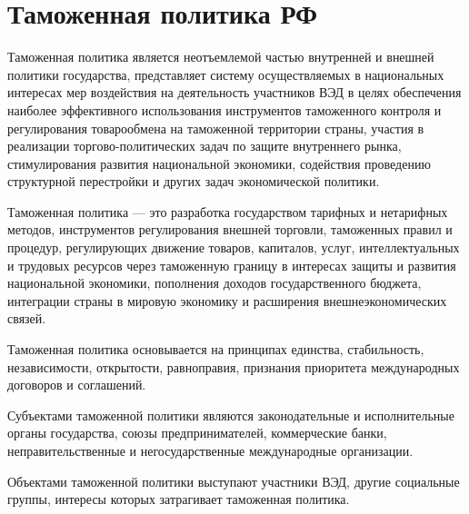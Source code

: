 \section{Таможенная политика РФ}

Таможенная политика является неотъемлемой частью внутренней и внешней политики государства, представляет систему осуществляемых в национальных интересах мер воздействия на деятельность участников ВЭД в целях обеспечения наиболее эффективного использования инструментов таможенного контроля и регулирования товарообмена на таможенной территории страны, участия в реализации торгово-политических задач по защите внутреннего рынка, стимулирования развития национальной экономики, содействия проведению структурной перестройки и других задач экономической политики.

Таможенная политика --- это разработка государством тарифных и нетарифных методов, инструментов регулирования внешней торговли, таможенных правил и процедур, регулирующих движение товаров, капиталов, услуг, интеллектуальных и трудовых ресурсов через таможенную границу в интересах защиты и развития национальной экономики, пополнения доходов государственного бюджета, интеграции страны в мировую экономику и расширения внешнеэкономических связей.

Таможенная политика основывается на принципах единства, стабильность, независимости, открытости, равноправия, признания приоритета международных договоров и соглашений.

Субъектами таможенной политики являются законодательные и исполнительные органы государства, союзы предпринимателей, коммерческие банки, неправительственные и негосударственные международные организации.

Объектами таможенной политики выступают участники ВЭД, другие социальные группы, интересы которых затрагивает таможенная политика.


